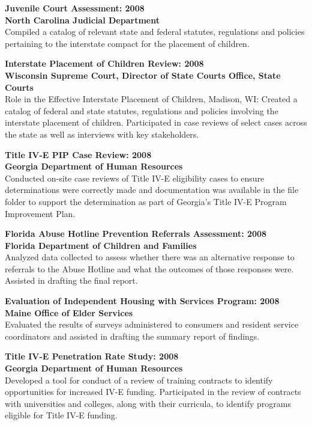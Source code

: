 \documentclass[line, margin, 10pt]{res}
\begin{document}
\begin{resume}
  {\bf Juvenile Court Assessment: 2008} \\
  {\bf North Carolina Judicial Department} \\
  Compiled a catalog of relevant state and federal statutes,
  regulations and policies pertaining to the interstate compact for
  the placement of children.

  {\bf Interstate Placement of Children Review: 2008} \\
  {\bf Wisconsin Supreme Court, Director of State Courts Office, State
    Courts} \\
  Role in the Effective Interstate Placement of Children, Madison, WI:
  Created a catalog of federal and state statutes, regulations and
  policies involving the interstate placement of children.  Participated
  in case reviews of select cases across the state as well as interviews
  with key stakeholders.

  {\bf Title IV-E PIP Case Review: 2008} \\
  {\bf Georgia Department of Human Resources} \\
  Conducted on-site case reviews of Title IV-E eligibility cases to
  ensure determinations were correctly made and documentation was
  available in the file folder to support the determination as part of
  Georgia's Title IV-E Program Improvement Plan.

  {\bf Florida Abuse Hotline Prevention Referrals Assessment: 2008} \\
  {\bf Florida Department of Children and Families} \\
  Analyzed data collected to assess whether there
  was an alternative response to referrals to the Abuse Hotline and
  what the outcomes of those responses were.  Assisted in drafting the
  final report.

  {\bf Evaluation of Independent Housing with Services Program: 2008} \\
  {\bf Maine Office of Elder Services} \\
  Evaluated the results of surveys administered to consumers and
  resident service coordinators and assisted in drafting the summary
  report of findings.

  {\bf Title IV-E Penetration Rate Study: 2008} \\
  {\bf Georgia Department of Human Resources} \\
  Developed a tool for conduct of a review of training contracts to
  identify opportunities for increased IV-E funding.  Participated in
  the review of contracts with universities and colleges, along with
  their curricula, to identify programs eligible for Title IV-E
  funding.


\end{resume}
\end{document}
